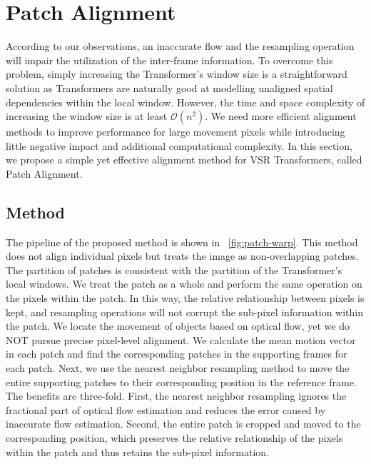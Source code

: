 \documentclass{article}
\begin{document}
\section{Patch Alignment}
\vspace{-2mm}
According to our observations, an inaccurate flow and the resampling operation will impair the utilization of the inter-frame information.
To overcome this problem, simply increasing the Transformer's window size is a straightforward solution as Transformers are naturally good at modelling unaligned spatial dependencies within the local window.
However, the time and space complexity of increasing the window size is at least $\mathcal{O}(n^2)$.
We need more efficient alignment methods to improve performance for large movement pixels while introducing little negative impact and additional computational complexity.
In this section, we propose a simple yet effective alignment method for VSR Transformers, called Patch Alignment.


\vspace{-2mm}
\subsection{Method}
\vspace{-2mm}
The pipeline of the proposed method is shown in \figurename~\ref{fig:patch-warp}.
This method does not align individual pixels but treats the image as non-overlapping patches.
The partition of patches is consistent with the partition of the Transformer's local windows.
We treat the patch as a whole and perform the same operation on the pixels within the patch.
In this way, the relative relationship between pixels is kept, and resampling operations will not corrupt the sub-pixel information within the patch.
We locate the movement of objects based on optical flow, yet we do NOT pursue precise pixel-level alignment.
We calculate the mean motion vector in each patch and find the corresponding patches in the supporting frames for each patch.
Next, we use the nearest neighbor resampling method to move the entire supporting patches to their corresponding position in the reference frame.
The benefits are three-fold.
First, the nearest neighbor resampling ignores the fractional part of optical flow estimation and reduces the error caused by inaccurate flow estimation.
Second, the entire patch is cropped and moved to the corresponding position, which preserves the relative relationship of the pixels within the patch and thus retains the sub-pixel information.
\end{document}
